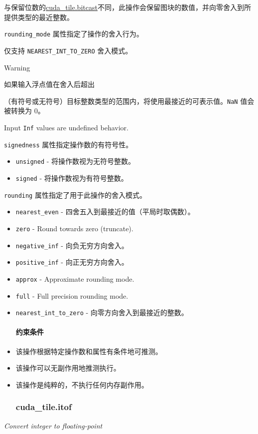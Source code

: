 \documentclass{article}
\begin{document}
与保留位数的\href{https://docs.nvidia.com/cuda/tile-ir/latest/sections/operations.html#op-cuda-tile-bitcast}{cuda\_tile.bitcast}不同，此操作会保留图块的数值，并向零舍入到所提供类型的最近整数。


\texttt{rounding\_mode} 属性指定了操作的舍入行为。

仅支持 \texttt{NEAREST\_INT\_TO\_ZERO} 舍入模式。


Warning


如果输入浮点值在舍入后超出

（有符号或无符号）目标整数类型的范围内，将使用最接近的可表示值。\texttt{NaN} 值会被转换为 0。

Input \texttt{Inf} values are undefined behavior.


\texttt{signedness} 属性指定操作数的有符号性。


\begin{itemize}
\item \texttt{unsigned} - 将操作数视为无符号整数。
\item \texttt{signed} - 将操作数视为有符号整数。

\end{itemize}
\texttt{rounding} 属性指定了用于此操作的舍入模式。


\begin{itemize}
\item \texttt{nearest\_even} - 四舍五入到最接近的值（平局时取偶数）。
\item \texttt{zero} - Round towards zero (truncate).
\item \texttt{negative\_inf} - 向负无穷方向舍入。
\item \texttt{positive\_inf} - 向正无穷方向舍入。
\item \texttt{approx} - Approximate rounding mode.
\item \texttt{full} - Full precision rounding mode.
\item \texttt{nearest\_int\_to\_zero} - 向零方向舍入到最接近的整数。


\paragraph{约束条件}

\item 该操作根据特定操作数和属性有条件地可推测。
\item 该操作可以无副作用地推测执行。
\item 该操作是纯粹的，不执行任何内存副作用。


\subsubsection{cuda\_tile.itof}

\end{itemize}
\textit{Convert integer to floating-point}
\end{document}
